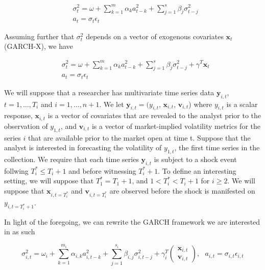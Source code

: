 \documentclass[11pt]{article}
\newcommand{\x}{\textbf{x}}
\newcommand{\y}{\textbf{y}}
\theoremstyle{definition}
\begin{document}
\begin{align*}
&\sigma_{t}^{2} = \omega + \sum^{m}_{k=1}\alpha_{k}a^{2}_{t-k} + \sum_{j=1}^{s}\beta_{j}\sigma_{t-j}^{2}\\
&a_{t} = \sigma_{t}\epsilon_{t}
\end{align*}



Assuming further that $\sigma^{2}_{t}$ depends on a vector of exogenous covariates $\x_{t}$ (GARCH-X), we have

\begin{align*}
&\sigma_{t}^{2} = \omega+ \sum^{m}_{k=1}\alpha_{k}a^{2}_{t-k} + \sum_{j=1}^{s}\beta_{j}\sigma_{t-j}^{2} + \gamma^{T}\x_{t}\\&a_{t} = \sigma_{t}\epsilon_{t}
\end{align*}


We will suppose that a researcher has multivariate time series data $\y_{i,t}$, $t = 1, \ldots,  T_i$ and $i = 1, \ldots, n+1$. We let $\y_{i,t} = (y_{i,t}$, $\x_{i,t}$, $\textbf{v}_{i,t}$) where $y_{i,t}$ is a scalar response,  $\x_{i,t}$ is a vector of covariates that are revealed to the analyst prior to the observation of $y_{1,t}$, and $\textbf{v}_{i,t}$ is a vector of market-implied volatility metrics for the series $i$ that are available prior to the market open at time t.  Suppose that the analyst is interested in forecasting the volatility of $y_{1,t}$, the first time series in the collection.  We require that each time series $\y_{i,t}$ is subject to a shock event follwing $T^*_i \leq T_i + 1$ and before witnessing $T^*_i+1$. To define an interesting setting, we will suppose that $T^*_1 = T_1 + 1$, and $1 < T^*_i < T_i + 1$ for $i \geq 2$. 
We will suppose that $\x_{i,t=T^*_i}$ and $\textbf{v}_{i,t=T^*_i}$ are observed before the shock is manifested on $y_{i,t=T^*_i+1}$.

In light of the foregoing, we can rewrite the GARCH framework we are interested in as such

$$\sigma_{i,t}^{2} = \omega_{i} + \sum^{m_{i}}_{k=1}\alpha_{i,k}a^{2}_{i,t-k} + \sum_{j=1}^{s_{i}}\beta_{i,j}\sigma_{i,t-j}^{2} + \gamma_{i}^{T} \begin{pmatrix}
          \x_{i,t} \\
           \textbf{v}_{i,t}
           \end{pmatrix}, \text{ } a_{i,t} = \sigma_{i,t}\epsilon_{i,t}$$

\end{document}
